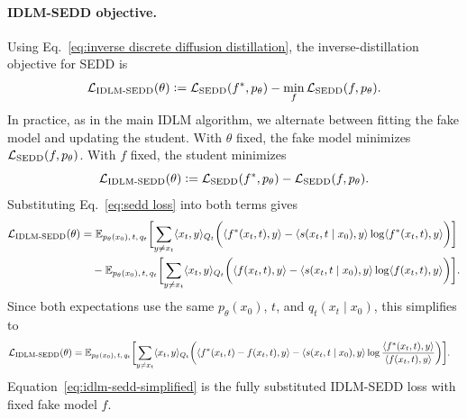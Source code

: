 \paragraph{IDLM-SEDD objective.}
Using Eq.~\eqref{eq:inverse discrete diffusion distillation}, the inverse-distillation objective for SEDD is
\begin{equation}
\label{eq:idlm-sedd-compact}
    \mathcal{L}_{\mathrm{IDLM\text{-}SEDD}}(\theta)
    \vcentcolon=
    \mathcal{L}_{\mathrm{SEDD}}(f^*,p_\theta)
    -
    \min_f \mathcal{L}_{\mathrm{SEDD}}(f,p_\theta).
\end{equation}
In practice, as in the main IDLM algorithm, we alternate between fitting the fake model and updating the student. With $\theta$ fixed, the fake model minimizes $\mathcal{L}_{\mathrm{SEDD}}(f,p_\theta)$. With $f$ fixed, the student minimizes
\begin{equation}
\label{eq:idlm-sedd-fixed-compact}
    \mathcal{L}_{\mathrm{IDLM\text{-}SEDD}}(\theta)
    \vcentcolon=
    \mathcal{L}_{\mathrm{SEDD}}(f^*,p_\theta)
    -
    \mathcal{L}_{\mathrm{SEDD}}(f,p_\theta).
\end{equation}
Substituting Eq.~\eqref{eq:sedd loss} into both terms gives
\begin{equation}
\label{eq:idlm-sedd-expanded}
\begin{aligned}
\mathcal{L}_{\mathrm{IDLM\text{-}SEDD}}(\theta)
&=
\mathbb{E}_{p_\theta(x_0),\,t,\,q_t}
\biggl[
\sum_{y\neq x_t}
\langle x_t,y\rangle_{Q_t}
\biggl(
\langle f^*(x_t,t),y\rangle
-
\langle s(x_t,t\mid x_0),y\rangle
\log\langle f^*(x_t,t),y\rangle
\biggr)
\biggr]
\\
&\quad-
\mathbb{E}_{p_\theta(x_0),\,t,\,q_t}
\biggl[
\sum_{y\neq x_t}
\langle x_t,y\rangle_{Q_t}
\biggl(
\langle f(x_t,t),y\rangle
-
\langle s(x_t,t\mid x_0),y\rangle
\log\langle f(x_t,t),y\rangle
\biggr)
\biggr].
\end{aligned}
\end{equation}
Since both expectations use the same $p_\theta(x_0)$, $t$, and $q_t(x_t\mid x_0)$, this simplifies to
\begin{equation}
\label{eq:idlm-sedd-simplified}
\begin{aligned}
\mathcal{L}_{\mathrm{IDLM\text{-}SEDD}}(\theta)
&=
\mathbb{E}_{p_\theta(x_0),\,t,\,q_t}
\biggl[
\sum_{y\neq x_t}
\langle x_t,y\rangle_{Q_t}
\biggl(
\langle f^*(x_t,t)-f(x_t,t),y\rangle
-
\langle s(x_t,t\mid x_0),y\rangle
\log
\frac{\langle f^*(x_t,t),y\rangle}{\langle f(x_t,t),y\rangle}
\biggr)
\biggr].
\end{aligned}
\end{equation}
Equation~\eqref{eq:idlm-sedd-simplified} is the fully substituted IDLM-SEDD loss with fixed fake model $f$.

